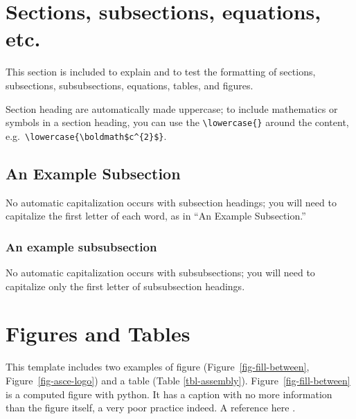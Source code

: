 \documentclass[Journal,LineNumbers]{ascelike-new}
\begin{document}
\section{Sections, subsections, equations,
etc.}\label{sections-subsections-equations-etc.}

This section is included to explain and to test the formatting of
sections, subsections, subsubsections, equations, tables, and figures.

Section heading are automatically made uppercase; to include mathematics
or symbols in a section heading, you can use the
\texttt{\textbackslash{}lowercase\{\}} around the content,
e.g.~\texttt{\textbackslash{}lowercase\{\textbackslash{}boldmath\$c\^{}\{2\}\$\}}.

\subsection{An Example Subsection}\label{an-example-subsection}

No automatic capitalization occurs with subsection headings; you will
need to capitalize the first letter of each word, as in ``An Example
Subsection.''

\subsubsection{An example subsubsection}\label{an-example-subsubsection}

No automatic capitalization occurs with subsubsections; you will need to
capitalize only the first letter of subsubsection headings.

\section{Figures and Tables}\label{figures-and-tables}

This template includes two examples of figure
(Figure~\ref{fig-fill-between}, Figure~\ref{fig-asce-logo}) and a table
(Table \ref{tbl-assembly}). Figure~\ref{fig-fill-between} is a computed
figure with python. It has a caption with no more information than the
figure itself, a very poor practice indeed. A reference here
\citep{Stahl:2004a}.
\end{document}
